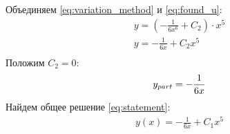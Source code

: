 Объединяем \ref{eq:variation_method} и \ref{eq:found_u}:
\begin{gather*}
	y = (-\frac{1}{6x^6} + C_2) \cdot x^5 \\
	y = -\frac{1}{6x} + C_2x^5 \\
\end{gather*}
Положим $C_2 = 0$:
\begin{equation} \label{eq:specific}
	y_{part} = -\frac{1}{6x} \\
\end{equation}
Найдем общее решение \ref{eq:statement}:
\begin{gather*}
	y(x) = -\frac{1}{6x} + C_1x^5 \\
\end{gather*}
